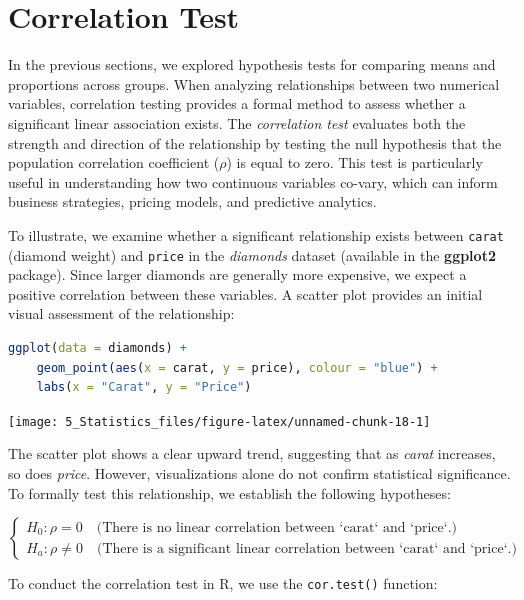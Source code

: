 \documentclass[
  11pt,
]{book}
\newcommand{\passthrough}[1]{#1}
\theoremstyle{definition}
\theoremstyle{definition}
\theoremstyle{definition}
\theoremstyle{definition}
\theoremstyle{remark}
\begin{document}
\section{Correlation Test}\label{correlation-test}

In the previous sections, we explored hypothesis tests for comparing means and proportions across groups. When analyzing relationships between two numerical variables, correlation testing provides a formal method to assess whether a significant linear association exists. The \emph{correlation test} evaluates both the strength and direction of the relationship by testing the null hypothesis that the population correlation coefficient (\(\rho\)) is equal to zero. This test is particularly useful in understanding how two continuous variables co-vary, which can inform business strategies, pricing models, and predictive analytics.

To illustrate, we examine whether a significant relationship exists between \passthrough{\lstinline!carat!} (diamond weight) and \passthrough{\lstinline!price!} in the \emph{diamonds} dataset (available in the \textbf{ggplot2} package). Since larger diamonds are generally more expensive, we expect a positive correlation between these variables. A scatter plot provides an initial visual assessment of the relationship:

\begin{lstlisting}[language=R]
ggplot(data = diamonds) +
    geom_point(aes(x = carat, y = price), colour = "blue") +
    labs(x = "Carat", y = "Price") 
\end{lstlisting}

\begin{center}\texttt{[image: 5\_Statistics\_files/figure-latex/unnamed-chunk-18-1]} \end{center}

The scatter plot shows a clear upward trend, suggesting that as \emph{carat} increases, so does \emph{price}. However, visualizations alone do not confirm statistical significance. To formally test this relationship, we establish the following hypotheses:

\[
\begin{cases}
    H_0: \rho   =  0 \quad \text{(There is no linear correlation between `carat` and `price`.)} \\
    H_a: \rho \neq 0 \quad \text{(There is a significant linear correlation between `carat` and `price`.)}
\end{cases}
\]

To conduct the correlation test in R, we use the \passthrough{\lstinline!cor.test()!} function:
\end{document}
